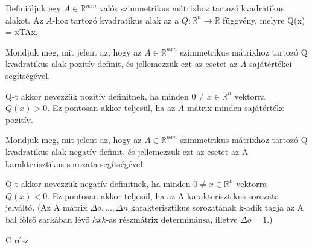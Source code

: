 \begin{frame}
  \begin{tcolorbox}[title={45}]
    Definiáljuk egy $A \in \mathbb{R}^{n x n}$ valós szimmetrikus mátrixhoz tartozó kvadratikus alakot.
  \tcblower
Az $A$-hoz tartozó kvadratikus alak az a $Q : \mathbb{R}^n {\rightarrow} \mathbb{R}$ függvény, melyre Q(x) = xTAx.
  \end{tcolorbox}
\end{frame}

\begin{frame}
  \begin{tcolorbox}[title={46}]
     Mondjuk meg, mit jelent az, hogy az $A \in \mathbb{R}^{n x n}$ szimmetrikus mátrixhoz tartozó Q kvadratikus alak pozitív definit, és jellemezzük ezt az esetet az $A$ sajátértékei segítségével.

  \tcblower
Q-t akkor nevezzük pozitív definitnek, ha minden $0 \neq x \in \mathbb{R}^n$ vektorra $Q(x) > 0$. Ez pontosan akkor teljesül, ha az $A$ mátrix minden sajátértéke pozitív.
  \end{tcolorbox}
\end{frame}


\begin{frame}
  \begin{tcolorbox}[title={46}]
     Mondjuk meg, mit jelent az, hogy az $A \in \mathbb{R}^{n x n}$ szimmetrikus mátrixhoz tartozó Q kvadratikus alak negatív definit, és jellemezzük ezt az esetet az A karakterisztikus sorozata segítségével.

  \tcblower
Q-t akkor nevezzük negatív definitnek, ha minden $0 \neq x \in \mathbb{R}^n$ vektorra $Q(x) < 0$. Ez pontosan akkor teljesül, ha az A karakterisztikus sorozata jelváltó. (Az A mátrix ${\Delta}o,...,{\Delta}n$ karakterisztikus sorozatának k-adik tagja az A bal fölső sarkában lévő $k x k$-as részmátrix determinánsa, illetve ${\Delta}o = 1$.)

  \end{tcolorbox}
\end{frame}




\begin{frame}[plain]
\begin{tcolorbox}[center, colback={myyellow}, coltext={black}, colframe={myyellow}]
    {\RHuge C rész}
    \mmedskip
\end{tcolorbox}
\end{frame}

